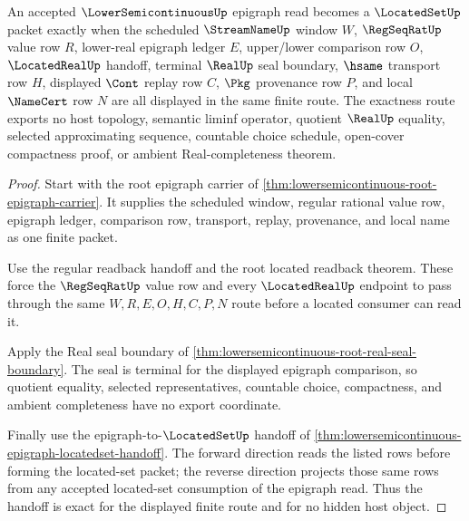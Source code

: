 \begin{theorem}
\label{thm:lowersemicontinuous-epigraph-locatedset-exactness}
An accepted $\LowerSemicontinuousUp$ epigraph read becomes a $\LocatedSetUp$ packet exactly when the scheduled $\StreamNameUp$ window $W$, $\RegSeqRatUp$ value row $R$, lower-real epigraph ledger $E$, upper/lower comparison row $O$, $\LocatedRealUp$ handoff, terminal $\RealUp$ seal boundary, $\hsame$ transport row $H$, displayed $\Cont$ replay row $C$, $\Pkg$ provenance row $P$, and local $\NameCert$ row $N$ are all displayed in the same finite route. The exactness route exports no host topology, semantic liminf operator, quotient $\RealUp$ equality, selected approximating sequence, countable choice schedule, open-cover compactness proof, or ambient Real-completeness theorem.
\end{theorem}
\begin{proof}
Start with the root epigraph carrier of \autoref{thm:lowersemicontinuous-root-epigraph-carrier}. It supplies the scheduled window, regular rational value row, epigraph ledger, comparison row, transport, replay, provenance, and local name as one finite packet.

Use the regular readback handoff and the root located readback theorem. These force the $\RegSeqRatUp$ value row and every $\LocatedRealUp$ endpoint to pass through the same $W,R,E,O,H,C,P,N$ route before a located consumer can read it.

Apply the Real seal boundary of \autoref{thm:lowersemicontinuous-root-real-seal-boundary}. The seal is terminal for the displayed epigraph comparison, so quotient equality, selected representatives, countable choice, compactness, and ambient completeness have no export coordinate.

Finally use the epigraph-to-$\LocatedSetUp$ handoff of \autoref{thm:lowersemicontinuous-epigraph-locatedset-handoff}. The forward direction reads the listed rows before forming the located-set packet; the reverse direction projects those same rows from any accepted located-set consumption of the epigraph read. Thus the handoff is exact for the displayed finite route and for no hidden host object.
\end{proof}

